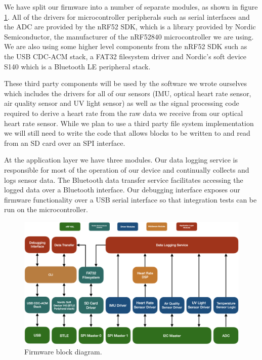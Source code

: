 We have split our firmware into a number of separate modules, as shown in figure
\ref{fig:fw_block_diag}. All of the drivers for microcontroller peripherals
such as serial interfaces and the ADC are provided by the nRF52 SDK, which is a
library provided by Nordic Semiconductor, the manufacturer of the nRF52840
microcontroller we are using. We are also using some higher level components
from the nRF52 SDK such as the USB CDC-ACM stack, a FAT32 filesystem driver and
Nordic's soft device S140 which is a Bluetooth LE peripheral stack.

These third party components will be used by the software we wrote ourselves
which includes the drivers for all of our sensors (IMU, optical heart rate
sensor, air quality sensor and UV light sensor) as well as the signal processing
code required to derive a heart rate from the raw data we receive from our
optical heart rate sensor. While we plan to use a third party file system
implementation we will still need to write the code that allows blocks to be
written to and read from an SD card over an SPI interface.

At the application layer we have three modules. Our data logging service is
responsible for most of the operation of our device and continually collects
and logs sensor data. The Bluetooth data transfer service facilitates accessing
the logged data over a Bluetooth interface. Our debugging interface exposes our
firmware functionality over a USB serial interface so that integration tests can
be run on the microcontroller.

\begin{figure}[!htb]
\centering
\includegraphics[width=\textwidth]{images/fw_block_diag.png}
\caption{Firmware block diagram.}
\label{fig:fw_block_diag}
\end{figure}

